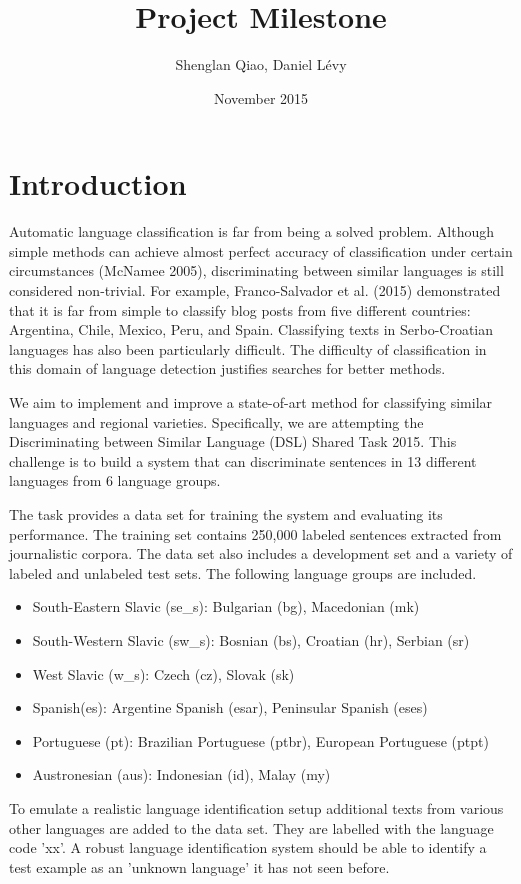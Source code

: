 \documentclass{article}
\title{Project Milestone}
\author{Shenglan Qiao, Daniel L\'{e}vy}
\date{November 2015}
\begin{document}
\maketitle

\section{Introduction}
Automatic language classification is far from being a solved problem. Although simple methods can achieve almost perfect accuracy of classification under certain circumstances (McNamee 2005), discriminating between similar languages is still considered non-trivial. For example, Franco-Salvador et al. (2015) demonstrated that it is far from simple to classify blog posts from five different countries: Argentina, Chile, Mexico, Peru, and Spain. Classifying texts in Serbo-Croatian languages has also been particularly difficult. The difficulty of classification in this domain of language detection justifies searches for better methods.

We aim to implement and improve a state-of-art method for classifying similar languages and regional varieties. Specifically, we are attempting the Discriminating between Similar Language (DSL) Shared Task 2015. This challenge is to build a system that can discriminate sentences in 13 different languages from 6 language groups.

The task provides a data set for training the system and evaluating its performance. The training set contains 250,000 labeled sentences extracted from journalistic corpora. The data set also includes a development set and a variety of labeled and unlabeled test sets. The following language groups are included.

\begin{itemize}
\item South-Eastern Slavic (se\_s): Bulgarian (bg), Macedonian (mk)
\item South-Western Slavic (sw\_s): Bosnian (bs), Croatian (hr), Serbian (sr)
\item West Slavic (w\_s): Czech (cz), Slovak (sk)
\item Spanish(es): Argentine Spanish (esar), Peninsular Spanish (eses)
\item Portuguese (pt): Brazilian Portuguese (ptbr), European Portuguese (ptpt)
\item Austronesian (aus): Indonesian (id), Malay (my)
\end{itemize}

To emulate a realistic language identification setup additional texts from various other languages are added to the data set. They are labelled with the language code 'xx'. A robust language identification system should be able to identify a test example as an 'unknown language' it has not seen before.
\end{document}
